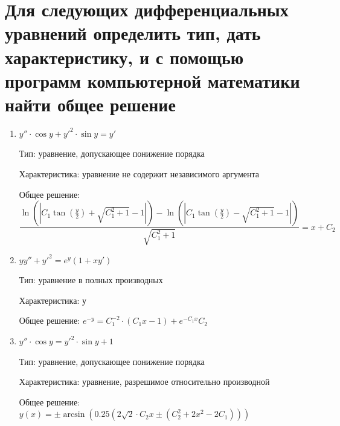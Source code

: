 \documentclass[14pt, a4paper]{extarticle}
\begin{document}
		\section{Для следующих дифференциальных уравнений определить тип, дать характеристику, и с помощью программ компьютерной математики найти общее решение}
			\begin{enumerate}
				\item \(y'' \cdot \cos y + y'^2 \cdot \sin y = y'\)
				
					Тип: уравнение,  допускающее понижение порядка
					
					Характеристика: уравнение не содержит независимого аргумента
					
					Общее решение: \[ \dfrac{\ln\left(\left|C_1\tan\left(\frac{y}{2}\right)+\sqrt{C_1^2+1}-1\right|\right)-\ln\left(\left|C_1\tan\left(\frac{y}{2}\right)-\sqrt{C_1^2+1}-1\right|\right)}{\sqrt{C_1^2+1}} = x + C_2\]
					
				\item \(yy'' + y'^2 = e^y(1+xy')\)
				
					Тип:  уравнение в полных производных
				
					Характеристика: у
				
					Общее решение: \(e^{-y} = C_1^{-2} \cdot (C_1x - 1) + e^{-C_1x}C_2\)
					
				\item \(y'' \cdot \cos y = y'^2 \cdot \sin y + 1\)
				
					Тип: уравнение,  допускающее понижение порядка
					
					Характеристика: уравнение, разрешимое относительно производной
				
					Общее решение: \(y(x) = \pm \arcsin\left(0.25\left(2\sqrt{2} \cdot C_2x\pm \left(C_2^2 + 2x^2 - 2C_1\right)\right)\right)\)
			\end{enumerate}
\end{document}
